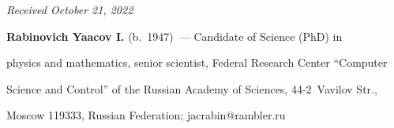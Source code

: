 \vspace*{-8pt}





\hfill{\small\textit{Received October 21, 2022}} 





\vspace*{-18pt}





\Contrl





\vspace*{-4pt}





\noindent


\textbf{Rabinovich Yaacov I.} (b.\ 1947)~--- Candidate of Science (PhD) in 


physics and mathematics, senior scientist, Federal Research Center ``Computer 


Science and Control'' of the Russian Academy of Sciences, 44-2~Vavilov Str., 


Moscow 119333, Russian Federation; \mbox{jacrabin@rambler.ru}





      

















\label{end\stat}





\renewcommand{\bibname}{\protect\rm Литература} 


